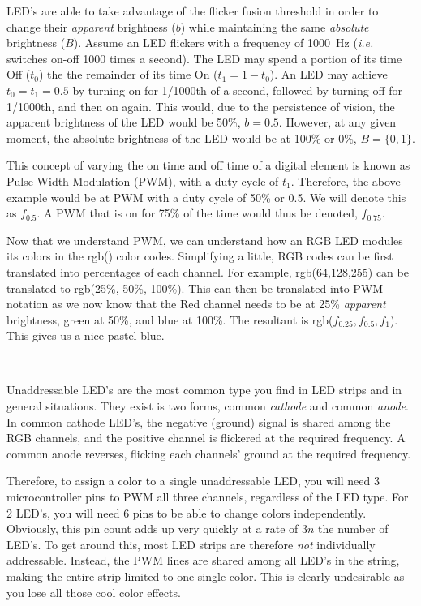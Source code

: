 \documentclass[11pt]{article}
\begin{document}
LED's are able to take advantage of the flicker fusion threshold in order to change their \emph{apparent} brightness (\(b\)) while maintaining the same \emph{absolute} brightness (\(B\)). Assume an LED flickers with a frequency of \SI{1000}{\hertz} (\emph{i.e.} switches on-off 1000 times a second). The LED may spend a portion of its time Off (\(t_0\)) the the remainder of its time On (\(t_1 = 1 - t_0\)). An LED may achieve \(t_0 = t_1 = 0.5\) by turning on for 1/1000th of a second, followed by turning off for 1/1000th, and then on again. This would, due to the persistence of vision,\footnotemark {} the apparent brightness of the LED would be 50\%, \(b=0.5\). However, at any given moment, the absolute brightness of the LED would be at 100\% or 0\%, \(B=\{0,1\}\). 

This concept of varying the on time and off time of a digital element is known as Pulse Width Modulation (PWM), with a duty cycle of \(t_1\). Therefore, the above example would be at PWM with a duty cycle of 50\% or 0.5. We will denote this as \(f_{0.5}\). A PWM that is on for 75\% of the time would thus be denoted, \(f_{0.75}\).


Now that we understand PWM, we can understand how an RGB LED modules its colors in the rgb() color codes. Simplifying a little, RGB codes can be first translated into percentages of each channel. For example, rgb(64,128,255) can be translated to rgb(25\%, 50\%, 100\%). This can then be translated into PWM notation as we now know that the Red channel needs to be at 25\% \emph{apparent} brightness, green at 50\%, and blue at 100\%. The resultant is rgb(\(f_{0.25},f_{0.5},f_{1}\)). This gives us a nice pastel blue. 

\


Unaddressable LED's are the most common type you find in LED strips and in general situations. They exist is two forms, common \emph{cathode} and common \emph{anode}. In common cathode LED's, the negative (ground) signal is shared among the RGB channels, and the positive channel is flickered at the required frequency. A common anode reverses, flicking each channels' ground at the required frequency. 

Therefore, to assign a color to a single unaddressable LED, you will need 3 microcontroller pins to PWM all three channels, regardless of the LED type. For 2 LED's, you will need 6 pins to be able to change colors independently. Obviously, this pin count adds up very quickly at a rate of \(3n\) the number of LED's. To get around this, most LED strips are therefore \emph{not} individually addressable. Instead, the PWM lines are shared among all LED's in the string, making the entire strip limited to one single color. This is clearly undesirable as you lose all those cool color effects.
\end{document}
